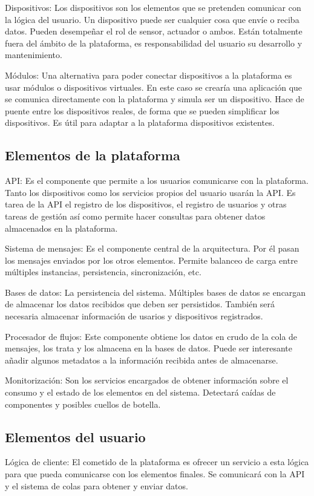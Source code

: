 Dispositivos: Los dispositivos son los elementos que se pretenden comunicar con
la lógica del usuario. Un dispositivo puede ser cualquier cosa que envíe o
reciba datos. Pueden desempeñar el rol de sensor, actuador o ambos. Están
totalmente fuera del ámbito de la plataforma, es responsabilidad del usuario su
desarrollo y mantenimiento.

Módulos: Una alternativa para poder conectar dispositivos a la plataforma es
usar módulos o dispositivos virtuales. En este caso se crearía una aplicación
que se comunica directamente con la plataforma y simula ser un dispositivo.
Hace de puente entre los dispositivos reales, de forma que se pueden simplificar
los dispositivos. Es útil para adaptar a la plataforma dispositivos existentes.

\subsection{Elementos de la plataforma}

API: Es el componente que permite a los usuarios comunicarse con la plataforma.
Tanto los dispositivos como los servicios propios del usuario usarán la API. Es
tarea de la API el registro de los dispositivos, el registro de usuarios y otras
tareas de gestión así como permite hacer consultas para obtener datos
almacenados en la plataforma.

Sistema de mensajes: Es el componente central de la arquitectura. Por él pasan
los mensajes enviados por los otros elementos. Permite balanceo de carga entre
múltiples instancias, persistencia, sincronización, etc.

Bases de datos: La persistencia del sistema. Múltiples bases de datos se
encargan de almacenar los datos recibidos que deben ser persistidos. También
será necesaria almacenar información de usarios y dispositivos registrados.

Procesador de flujos: Este componente obtiene los datos en crudo de la cola de
mensajes, los trata y los almacena en la bases de datos. Puede ser interesante
añadir algunos metadatos a la información recibida antes de almacenarse.

Monitorización: Son los servicios encargados de obtener información sobre el
consumo y el estado de los elementos en del sistema. Detectará caídas de
componentes y posibles cuellos de botella.

\subsection{Elementos del usuario}

Lógica de cliente: El cometido de la plataforma es ofrecer un servicio a esta
lógica para que pueda comunicarse con los elementos finales. Se comunicará con
la API y el sistema de colas para obtener y enviar datos.
